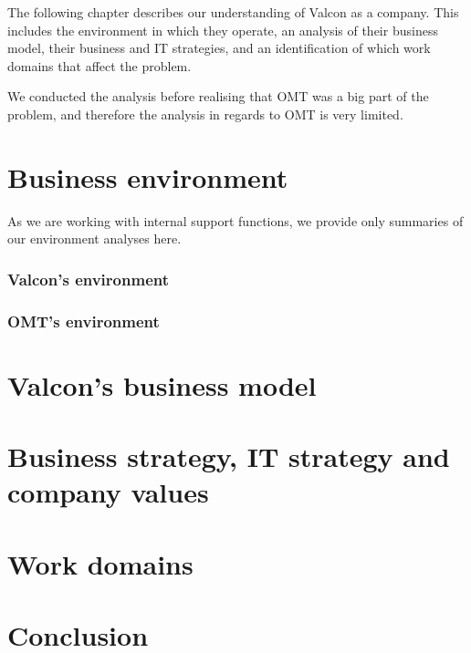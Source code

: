 The following chapter describes our understanding of Valcon as a company. This includes the environment in which they operate, an analysis of their business model, their business and IT strategies, and an identification of which work domains that affect the problem.

We conducted the analysis before realising that OMT was a big part of the problem, and therefore the analysis in regards to OMT is very limited.

\section{Business environment}
As we are working with internal support functions, we provide only summaries of our environment analyses here.
\subsubsection{Valcon's environment}

\subsubsection{OMT's environment}

\section{Valcon's business model}

\section{Business strategy, IT strategy and company values}

\section{Work domains}

\section{Conclusion}
